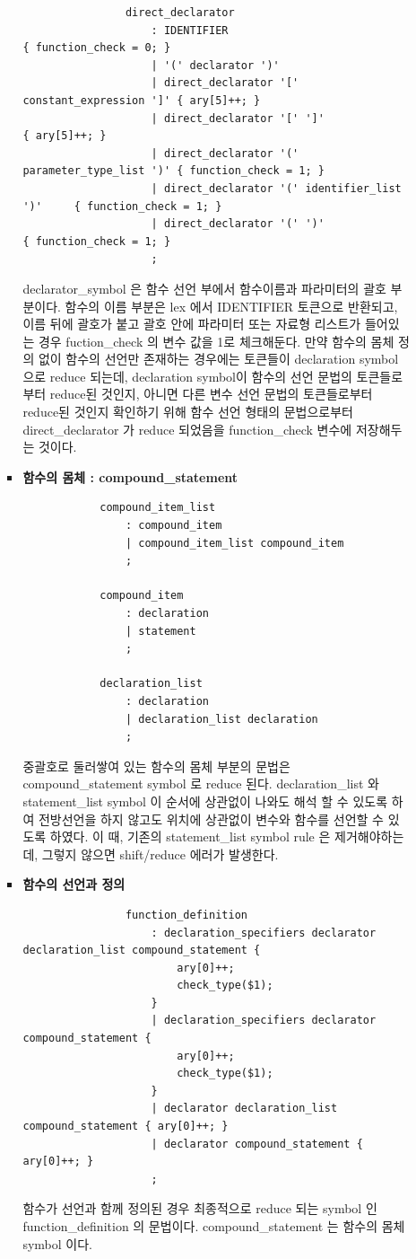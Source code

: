 \documentclass{article}
\begin{document}
\begin{itemize}
\begin{itemize}
\begin{itemize}
\begin{lstlisting}
				direct_declarator
					: IDENTIFIER									{ function_check = 0; }
					| '(' declarator ')'		
					| direct_declarator '[' constant_expression ']'	{ ary[5]++; }
					| direct_declarator '[' ']'						{ ary[5]++; }
					| direct_declarator '(' parameter_type_list ')' { function_check = 1; }
					| direct_declarator '(' identifier_list ')'		{ function_check = 1; }
					| direct_declarator '(' ')'						{ function_check = 1; }
					;
			\end{lstlisting}
			declarator\_symbol 은 함수 선언 부에서 함수이름과 파라미터의 괄호 부분이다.
			함수의 이름 부분은 lex 에서 IDENTIFIER 토큰으로 반환되고, 이름 뒤에 괄호가 붙고 괄호 안에 파라미터
			또는 자료형 리스트가 들어있는 경우 fuction\_check 의 변수 값을 1로 체크해둔다. 만약 함수의 몸체 정의 없이
			함수의 선언만 존재하는 경우에는 토큰들이 declaration symbol 으로 reduce 되는데, declaration symbol이
			함수의 선언 문법의 토큰들로 부터 reduce된 것인지, 아니면 다른 변수 선언 문법의 토큰들로부터 reduce된 것인지
			확인하기 위해 함수 선언 형태의 문법으로부터 direct\_declarator 가 reduce 되었음을 function\_check
			변수에 저장해두는 것이다.

			\item {\bf 함수의 몸체 : compound\_statement}
			\begin{lstlisting}
			compound_item_list
				: compound_item
				| compound_item_list compound_item
				;
			
			compound_item
				: declaration
				| statement
				;
			
			declaration_list
				: declaration
				| declaration_list declaration
				;
			\end{lstlisting}
			중괄호로 둘러쌓여 있는 함수의 몸체 부분의 문법은 compound\_statement symbol 로 reduce 된다.
			declaration\_list 와 statement\_list symbol 이 순서에 상관없이 나와도 해석 할 수 있도록 하여
			전방선언을 하지 않고도 위치에 상관없이 변수와 함수를 선언할 수 있도록 하였다. 이 때, 기존의 statement\_list
			symbol rule 은 제거해야하는데, 그렇지 않으면 shift/reduce 에러가 발생한다.

			\item {\bf 함수의 선언과 정의}
			\begin{lstlisting}
				function_definition
					: declaration_specifiers declarator declaration_list compound_statement {
						ary[0]++;
						check_type($1);
					}
					| declaration_specifiers declarator compound_statement {
						ary[0]++;
						check_type($1);
					}
					| declarator declaration_list compound_statement { ary[0]++; }
					| declarator compound_statement	{ ary[0]++; }
					;
			\end{lstlisting}
			함수가 선언과 함께 정의된 경우 최종적으로 reduce 되는 symbol 인 function\_definition 의 문법이다.
			compound\_statement 는 함수의 몸체 symbol 이다.


\end{itemize}
\end{itemize}
\end{itemize}
\end{document}
